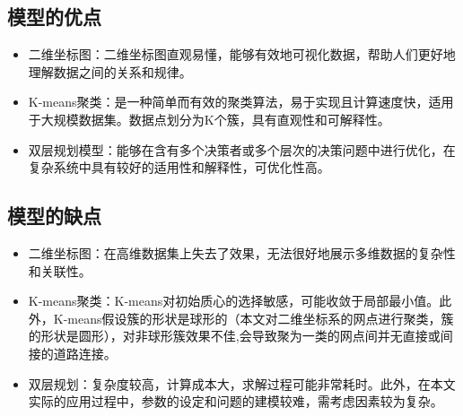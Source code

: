 \documentclass[withoutpreface,bwprint]{cumcmthesis} %
\begin{document}
\subsection{模型的优点}
\begin{itemize}
	\item 二维坐标图：二维坐标图直观易懂，能够有效地可视化数据，帮助人们更好地理解数据之间的关系和规律。 
	\item K-means聚类：是一种简单而有效的聚类算法，易于实现且计算速度快，适用于大规模数据集。数据点划分为K个簇，具有直观性和可解释性。
	\item 双层规划模型：能够在含有多个决策者或多个层次的决策问题中进行优化，在复杂系统中具有较好的适用性和解释性，可优化性高。
\end{itemize}


\subsection{模型的缺点}
\begin{itemize}
	\item 二维坐标图：在高维数据集上失去了效果，无法很好地展示多维数据的复杂性和关联性。
	\item K-means聚类：K-means对初始质心的选择敏感，可能收敛于局部最小值。此外，K-means假设簇的形状是球形的（本文对二维坐标系的网点进行聚类，簇的形状是圆形），对非球形簇效果不佳,会导致聚为一类的网点间并无直接或间接的道路连接。
	\item 双层规划：复杂度较高，计算成本大，求解过程可能非常耗时。此外，在本文实际的应用过程中，参数的设定和问题的建模较难，需考虑因素较为复杂。
\end{itemize}
	
	
	\newpage
	
\end{document}
